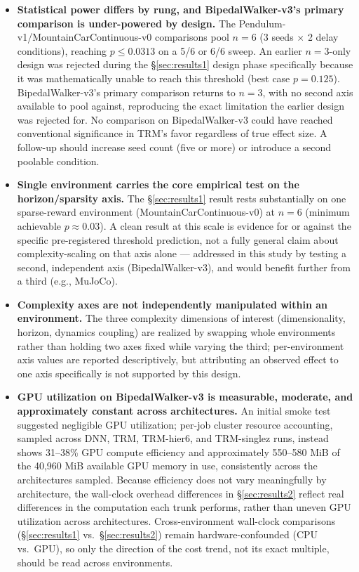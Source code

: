 \documentclass[11pt]{article}
\begin{document}
\begin{itemize}
  \item \textbf{Statistical power differs by rung, and BipedalWalker-v3's primary comparison is under-powered by design.} The Pendulum-v1/MountainCarContinuous-v0 comparisons pool $n=6$ (3 seeds $\times$ 2 delay conditions), reaching $p \leq 0.0313$ on a 5/6 or 6/6 sweep. An earlier $n=3$-only design was rejected during the \S\ref{sec:results1} design phase specifically because it was mathematically unable to reach this threshold (best case $p=0.125$). BipedalWalker-v3's primary comparison returns to $n=3$, with no second axis available to pool against, reproducing the exact limitation the earlier design was rejected for. No comparison on BipedalWalker-v3 could have reached conventional significance in TRM's favor regardless of true effect size. A follow-up should increase seed count (five or more) or introduce a second poolable condition.
  \item \textbf{Single environment carries the core empirical test on the horizon/sparsity axis.} The \S\ref{sec:results1} result rests substantially on one sparse-reward environment (MountainCarContinuous-v0) at $n=6$ (minimum achievable $p \approx 0.03$). A clean result at this scale is evidence for or against the specific pre-registered threshold prediction, not a fully general claim about complexity-scaling on that axis alone --- addressed in this study by testing a second, independent axis (BipedalWalker-v3), and would benefit further from a third (e.g., MuJoCo).
  \item \textbf{Complexity axes are not independently manipulated within an environment.} The three complexity dimensions of interest (dimensionality, horizon, dynamics coupling) are realized by swapping whole environments rather than holding two axes fixed while varying the third; per-environment axis values are reported descriptively, but attributing an observed effect to one axis specifically is not supported by this design.
  \item \textbf{GPU utilization on BipedalWalker-v3 is measurable, moderate, and approximately constant across architectures.} An initial smoke test suggested negligible GPU utilization; per-job cluster resource accounting, sampled across DNN, TRM, TRM-hier6, and TRM-singlez runs, instead shows 31--38\% GPU compute efficiency and approximately 550--580 MiB of the 40{,}960 MiB available GPU memory in use, consistently across the architectures sampled. Because efficiency does not vary meaningfully by architecture, the wall-clock overhead differences in \S\ref{sec:results2} reflect real differences in the computation each trunk performs, rather than uneven GPU utilization across architectures. Cross-environment wall-clock comparisons (\S\ref{sec:results1} vs.\ \S\ref{sec:results2}) remain hardware-confounded (CPU vs.\ GPU), so only the direction of the cost trend, not its exact multiple, should be read across environments.

\end{itemize}
\end{document}
